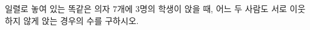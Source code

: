 \hspace*{2mm}\begin{minipage}[t]{\dimexpr\linewidth-2mm\relax}\vspace{0pt}
일렬로 놓여 있는 똑같은 의자 $7$개에 $3$명의 학생이 앉을 때, 어느 두 사람도 서로 이웃하지 않게 앉는 경우의 수를 구하시오.\end{minipage}

